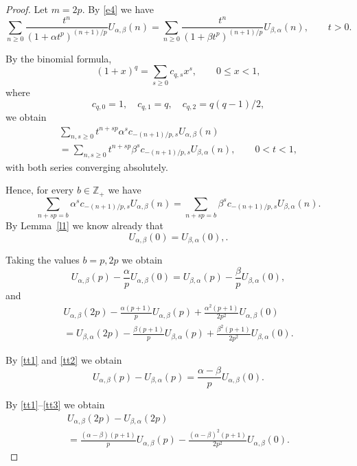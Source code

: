 \documentclass[12pt]{amsart}
\numberwithin{equation}{section}
\theoremstyle{plain}
\numberwithin{equation}{section}
\begin{document}
\begin{proof} Let $m=2p$. By \eqref{e4} we have
$$
\sum_{n\ge 0} \frac{t^n}{(1+\alpha t^p)^{(n+1)/p}}U_{\alpha,\beta}(n)=\sum_{n\ge 0} \frac{t^n}{(1+\beta t^p)^{(n+1)/p}}U_{\beta,\alpha}(n),\qquad t>0.
$$

By the binomial formula, 
$$
(1+x)^q=\sum_{s\ge 0}c_{q,s}x^s,\qquad 0\le x<1,
$$
where 
$$
c_{q,0}=1,\quad c_{q,1}=q,\quad c_{q,2}=q(q-1)/2,
$$
we obtain
\begin{multline}
\sum_{n,s\ge 0}t^{n+sp}\alpha^s c_{-(n+1)/p,s}U_{\alpha,\beta}(n)\\=\sum_{n,s\ge 0}t^{n+sp}\beta^s c_{-(n+1)/p,s}U_{\beta,\alpha}(n),\qquad 0<t<1,
\end{multline}
with both series converging absolutely.

Hence, for every $b\in\mathbb Z_+$ we have
$$
\sum_{n+sp=b} \alpha^s c_{-(n+1)/p,s}U_{\alpha,\beta}(n)=\sum_{n+sp=b}\beta^s c_{-(n+1)/p,s}U_{\beta,\alpha}(n).
$$
By Lemma~\ref{l1} we know already that 
\begin{equation}
U_{\alpha,\beta}(0)=U_{\beta,\alpha}(0),\label{tt1}.
\end{equation}

Taking the values $b=p,2p$ we obtain 
\begin{equation}
U_{\alpha,\beta}(p)-\frac{\alpha}p U_{\alpha,\beta}(0)=U_{\beta,\alpha}(p)-\frac{\beta}p U_{\beta,\alpha}(0),\label{tt2}
\end{equation}
and
\begin{multline}
U_{\alpha,\beta}(2p)-\frac{\alpha(p+1)}p U_{\alpha,\beta}(p)+\frac{\alpha^2(p+1)}{2p^2}U_{\alpha,\beta}(0)\\=U_{\beta,\alpha}(2p)-\frac{\beta(p+1)}p U_{\beta,\alpha}(p)+\frac{\beta^2(p+1)}{2p^2}U_{\beta,\alpha}(0).\label{tt3}
\end{multline}

By \eqref{tt1} and \eqref{tt2} we obtain
\begin{equation}
U_{\alpha,\beta}(p)-U_{\beta,\alpha}(p)= \frac{\alpha-\beta}p U_{\alpha,\beta}(0).
\label{tt4}
\end{equation}

By \eqref{tt1}--\eqref{tt3} we obtain
\begin{multline}
U_{\alpha,\beta}(2p)-U_{\beta,\alpha}(2p)\\=\frac{(\alpha-\beta)(p+1)}p U_{\alpha,\beta}(p)-\frac{(\alpha-\beta)^2(p+1)}{2p^2}U_{\alpha,\beta}(0).
\label{tt5}
\end{multline}


\end{proof}
\end{document}

